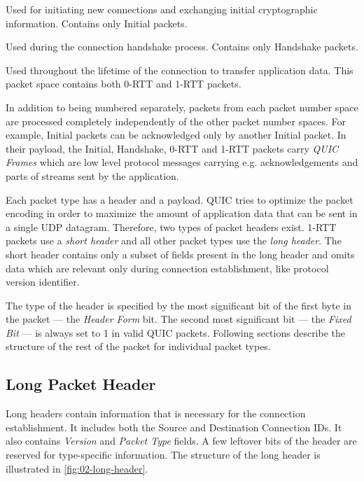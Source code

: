 \begin{enumerate}

   Used for initiating new connections and exchanging initial cryptographic
  information. Contains only Initial packets.

   Used during the connection handshake process. Contains only Handshake packets.

   Used throughout the lifetime of the connection to transfer application data.
  This packet space contains both 0-RTT and 1-RTT packets.

\end{enumerate}

In addition to being numbered separately, packets from each packet number space are processed
completely independently of the other packet number spaces. For example, Initial packets can be
acknowledged only by another Initial packet. In their payload, the Initial, Handshake, 0-RTT and
1-RTT packets carry \textit{QUIC Frames} which are low level protocol messages carrying e.g.
acknowledgements and parts of streams sent by the application.

Each packet type has a header and a payload. QUIC tries to optimize the packet encoding in order to
maximize the amount of application data that can be sent in a single UDP datagram. Therefore, two
types of packet headers exist. 1-RTT packets use a \textit{short header} and all other packet types
use the \textit{long header}. The short header contains only a subset of fields present in the long
header and omits data which are relevant only during connection establishment, like protocol version
identifier.

The type of the header is specified by the most significant bit of the first byte in the packet ---
the \textit{Header Form} bit. The second most significant bit --- the \textit{Fixed Bit} --- is always
set to 1 in valid QUIC packets. Following sections describe the structure of the rest of the packet
for individual packet types.

\newcommand{\longFieldHeight}{1}

\subsection{Long Packet Header}

Long headers contain information that is necessary for the connection establishment. It includes
both the Source and Destination Connection IDs. It also contains \textit{Version} and \textit{Packet
  Type} fields. A few leftover bits of the header are reserved for type-specific information. The
structure of the long header is illustrated in \autoref{fig:02-long-header}.

